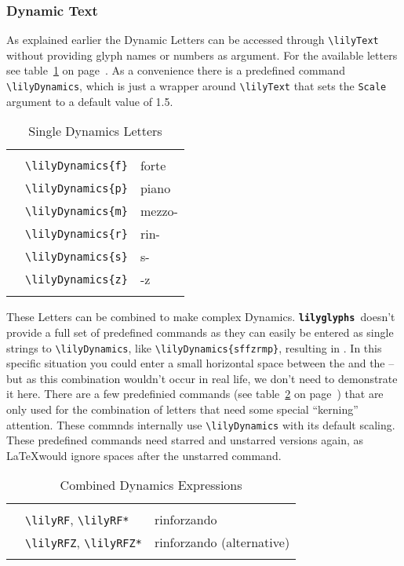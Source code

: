 \documentclass{article}
\newcommand*{\lilyglyphs}{\texttt{\textbf{lilyglyphs\,}}}
\newcommand*{\cmd}[1]{\texttt{\textbackslash #1}}
\newcommand{\tmpCaption}{} %
\newcommand{\tmpLabel}{}
\newenvironment{reftable}[2]
	{%
		\renewcommand{\tmpCaption}{#1}
		\renewcommand{\tmpLabel}{#2}
		\begin{table}[ht]
		\begin{center}
		\begin{tabular}[t]{lll}
		\hline
		&\\
	}
	{%
		&\\
		\hline
		\end{tabular}
		\caption{\tmpCaption}
		\label{table:\tmpLabel}
		\end{center}
		\end{table}
	}
\begin{document}
\subsubsection{Dynamic Text}
\label{subsubsec:dynamic_text}
As explained earlier the Dynamic Letters can be accessed through \cmd{lilyText} without providing glyph names or numbers as argument. 
For the available letters see table~\ref{table:singleDynLetters} on page~\pageref{table:singleDynLetters}. 
As a convenience there is a predefined command \cmd{lilyDynamics}, which is just a wrapper around \cmd{lilyText} that sets the \texttt{Scale} argument to a default value of 1.5.

\begin{reftable}{Single Dynamics Letters}{singleDynLetters}
\lilyDynamics{f} & \cmd{lilyDynamics\{f\}} & forte\\
\lilyDynamics{p} & \cmd{lilyDynamics\{p\}} & piano\\
\lilyDynamics{m} & \cmd{lilyDynamics\{m\}} & mezzo-\\
\lilyDynamics{r} & \cmd{lilyDynamics\{r\}} & rin-\\
\lilyDynamics{s} & \cmd{lilyDynamics\{s\}} & s-\\
\lilyDynamics{z} & \cmd{lilyDynamics\{z\}} & -z\\
\end{reftable}

These Letters can be combined to make complex Dynamics. 
\lilyglyphs doesn't provide a full set of predefined commands as they can easily be entered as single strings to \cmd{lilyDynamics}, like \cmd{lilyDynamics\{sffzrmp\}}, resulting in . 
In this specific situation you could enter a small horizontal space between the  and the  -- but as this combination wouldn't occur in real life, we don't need to demonstrate it here.
There are a few predefinied commands (see table~\ref{table:combinedDynLetters} on page~\pageref{table:combinedDynLetters}) that are only used for the combination of letters that need some special \enquote{kerning} attention. These commnds internally use \cmd{lilyDynamics} with its default scaling. These predefined commands need starred and unstarred versions again, as \LaTeX would ignore spaces after the unstarred command.

\begin{reftable}{Combined Dynamics Expressions}{combinedDynLetters}
\lilyRF* & \cmd{lilyRF}, \cmd{lilyRF*} & rinforzando\\
\lilyRFZ* & \cmd{lilyRFZ}, \cmd{lilyRFZ*} & rinforzando (alternative)\\

\end{reftable}
\end{document}
